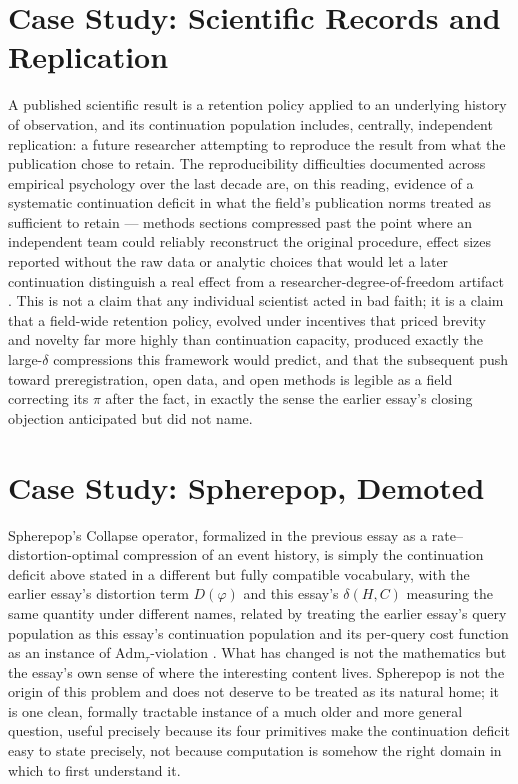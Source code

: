 \documentclass[11pt]{article}
\begin{document}
\section{Case Study: Scientific Records and Replication}

A published scientific result is a retention policy applied to an underlying history of observation, and its continuation population includes, centrally, independent replication: a future researcher attempting to reproduce the result from what the publication chose to retain. The reproducibility difficulties documented across empirical psychology over the last decade are, on this reading, evidence of a systematic continuation deficit in what the field's publication norms treated as sufficient to retain --- methods sections compressed past the point where an independent team could reliably reconstruct the original procedure, effect sizes reported without the raw data or analytic choices that would let a later continuation distinguish a real effect from a researcher-degree-of-freedom artifact \cite{opensciencecollaboration2015}. This is not a claim that any individual scientist acted in bad faith; it is a claim that a field-wide retention policy, evolved under incentives that priced brevity and novelty far more highly than continuation capacity, produced exactly the large-$\delta$ compressions this framework would predict, and that the subsequent push toward preregistration, open data, and open methods is legible as a field correcting its $\pi$ after the fact, in exactly the sense the earlier essay's closing objection anticipated but did not name.

\section{Case Study: Spherepop, Demoted}

Spherepop's Collapse operator, formalized in the previous essay as a rate--distortion-optimal compression of an event history, is simply the continuation deficit above stated in a different but fully compatible vocabulary, with the earlier essay's distortion term $D(\varphi)$ and this essay's $\delta(H, C)$ measuring the same quantity under different names, related by treating the earlier essay's query population as this essay's continuation population and its per-query cost function as an instance of $\mathrm{Adm}_\tau$-violation \cite{shannon1948}. What has changed is not the mathematics but the essay's own sense of where the interesting content lives. Spherepop is not the origin of this problem and does not deserve to be treated as its natural home; it is one clean, formally tractable instance of a much older and more general question, useful precisely because its four primitives make the continuation deficit easy to state precisely, not because computation is somehow the right domain in which to first understand it.
\end{document}
